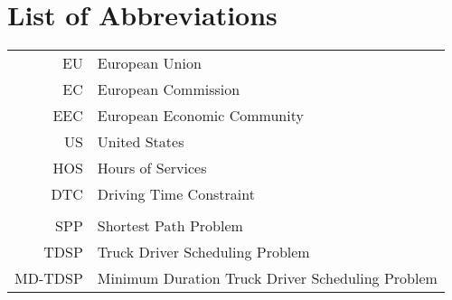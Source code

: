 

\appendix

{}	%
{}	%

\section{List of Abbreviations\label{app:abb}}

\begin{tabular}{rp{}}
	EU          & European Union                                                                                                               \\
	EC          & European Commission                                                                                                          \\
	EEC         & European Economic Community                                                                                                  \\
	US          & United States                                                                                                                \\
	HOS         & Hours of Services                                                                                                            \\
	DTC         & Driving Time Constraint                                                                                                      \\
	\vspace{2\baselineskip}                                                                                                                    \\
	SPP         & Shortest Path Problem                                                                                                        \\
	TDSP        & Truck Driver Scheduling Problem                                                                                              \\
	MD-TDSP     & Minimum Duration Truck Driver Scheduling Problem                                                                             \\

\end{tabular}
